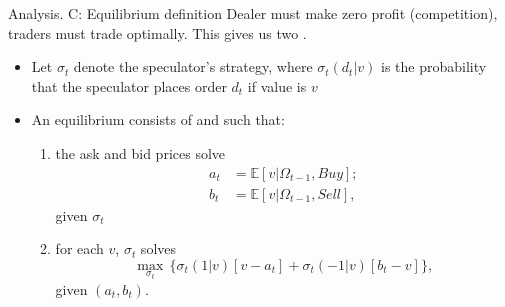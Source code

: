 \documentclass[english,10pt
,aspectratio=169
]{beamer}
\begin{document}
\begin{frame}{Analysis. C: Equilibrium definition}
Dealer must make zero profit ({competition}), traders must trade optimally.
This gives us two .
\begin{itemize}
	\item Let $\sigma_t$ denote the speculator's strategy, where $\sigma_t(d_t|v)$ is the probability that the speculator places order $d_t$ if value is $v$
	\item \alert{An equilibrium} consists of  and  such that:
	\begin{enumerate}
		\item the ask and bid prices  solve 
		\begin{align*}
		a_t & = \mathbb{E}[v| \Omega_{t-1}, Buy]; \\
		b_t & = \mathbb{E}[v| \Omega_{t-1}, Sell],
		\end{align*}
		given $\sigma_t$
		\item for each $v$, $\sigma_t$ solves 
		\[
		\max_{\sigma_t } \, \{\sigma_t(1|v) [v-a_t] + \sigma_t(-1|v)[b_t-v] \},
		\]
		given $(a_t,b_t)$.
	\end{enumerate} 
\end{itemize}
\end{frame}
\end{document}
